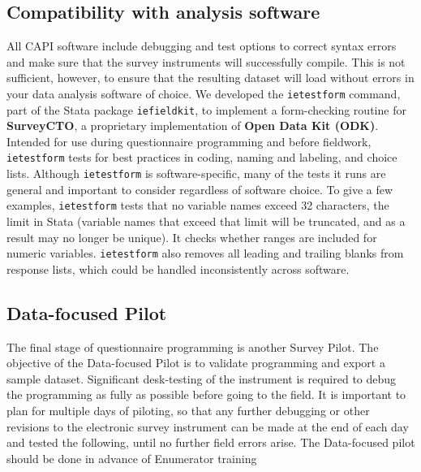 \subsection{Compatibility with analysis software}
All CAPI software include debugging and test options to correct syntax errors and make sure that the survey instruments will successfully compile.
This is not sufficient, however, to ensure that the resulting dataset will load without errors in your data analysis software of choice.
We developed the \texttt{ietestform} 
command, part of 
the Stata package
\texttt{iefieldkit}, to implement a form-checking routine for \textbf{SurveyCTO}, a proprietary implementation of \textbf{Open Data Kit (ODK)}.
Intended for use during questionnaire programming and before fieldwork, 
\texttt{ietestform} tests for best practices in coding, naming and labeling, 
and choice lists.
Although \texttt{ietestform} is software-specific, many of the tests it runs are general and important to consider regardless of software choice.
To give a few examples, \texttt{ietestform} tests that no variable names exceed 
32 characters, the limit in Stata (variable names that exceed that limit will 
be truncated, and as a result may no longer be unique). It checks whether 
ranges are included for numeric variables.
\texttt{ietestform} also removes all leading and trailing blanks from response lists, which could be handled inconsistently across software.

\subsection{Data-focused Pilot}
The final stage of questionnaire programming is another Survey Pilot.
The objective of the Data-focused Pilot  is to validate programming and export a sample dataset.
Significant desk-testing of the instrument is required to debug the programming as fully as possible before going to the field.
It is important to plan for multiple days of piloting, so that any further debugging or other revisions to the electronic survey instrument can be made at the end of each day and tested the following, until no further field errors arise.
The Data-focused pilot should be done in advance of Enumerator training



